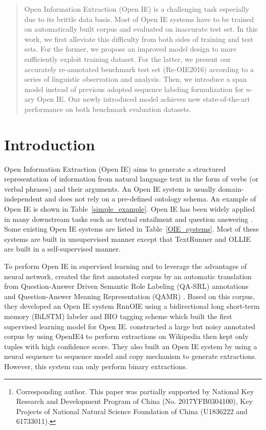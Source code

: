 \documentclass[letterpaper]{article} \usepackage{aaai20}  \usepackage{times}  \usepackage{helvet} \usepackage{courier}  \usepackage[hyphens]{url}  \urlstyle{rm} \def\UrlFont{\rm}  \usepackage{graphicx}  \frenchspacing  \setlength{\pdfpagewidth}{8.5in}  \setlength{\pdfpageheight}{11in}
\author{Junlang Zhan\textsuperscript{\rm 1,\rm 2,\rm 3}, Hai Zhao\textsuperscript{\rm 1,\rm 2,\rm 3,}\thanks{Corresponding author. This paper was partially supported by National Key Research and Development Program of China (No. 2017YFB0304100), 
Key Projects of National Natural Science Foundation of China (U1836222 and 61733011).}\\ \textsuperscript{\rm 1}Department of Computer Science and Engineering, Shanghai Jiao Tong University\\ \textsuperscript{\rm 2} Key Laboratory of Shanghai Education Commission for Intelligent Interaction \\
and Cognitive Engineering, Shanghai Jiao Tong University, Shanghai, China \\
\textsuperscript{\rm 3} MoE Key Lab of Artificial Intelligence, AI Institute, Shanghai Jiao Tong University \\
longmr.zhan@sjtu.edu.cn, zhaohai@cs.sjtu.edu.cn }
\begin{document}
\maketitle

\begin{abstract}
Open Information Extraction (Open IE) is a challenging task especially due to its brittle data basis. Most of Open IE systems have to be trained on automatically built corpus and evaluated on inaccurate test set. In this work, we first alleviate this difficulty from both sides of training and test sets. For the former, we propose an improved model design to more sufficiently exploit training dataset. For the latter, we present our accurately re-annotated benchmark test set (Re-OIE2016) according to a series of linguistic observation and analysis. Then, we introduce a span model instead of previous adopted sequence labeling formulization for $n$-ary Open IE. Our newly introduced model achieves new state-of-the-art performance on both benchmark evaluation datasets.
\end{abstract}

\section{Introduction}
Open Information Extraction (Open IE) aims to generate a structured representation of information from natural language text in the form of verbs (or verbal phrases) and their arguments. An Open IE system is usually domain-independent and does not rely on a pre-defined ontology schema. An example of Open IE is shown in Table~\ref{simple_example}. Open IE has been widely applied in many downstream tasks such as textual entailment and question answering \cite{Fader2014OpenQA}. Some existing Open IE systems are listed in Table~\ref{OIE_systems}. Most of these systems are built in unsupervised manner except that TextRunner and OLLIE are built in a self-supervised manner.

To perform Open IE in supervised learning and to leverage the advantages of neural network, \cite{Stanovsky2018SupervisedOI} created the first annotated corpus by an automatic translation from Question-Answer Driven Semantic Role Labeling (QA-SRL) annotations \cite{He2015QuestionAnswerDS} and Question-Answer Meaning Representation (QAMR) \cite{Michael2018CrowdsourcingQM}. Based on this corpus, they developed an Open IE system RnnOIE using a bidirectional long short-term memory (BiLSTM) labeler and BIO tagging scheme which built the first supervised learning model for Open IE. \cite{Cui2018NeuralOI} constructed a large but noisy annotated corpus by using OpenIE4 to perform extractions on Wikipedia then kept only tuples with high confidence score. They also built an Open IE system by using a neural sequence to sequence model and copy mechanism to generate extractions. However, this system can only perform binary extractions.
\end{document}
